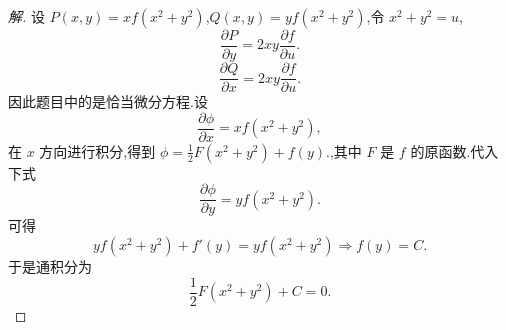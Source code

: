 \documentclass[twoside,11pt]{article}
\newcommand{\pa}{\partial} \newcommand{\Om}{\Omega}
\begin{document}
\begin{proof}[解]
  设 $P(x,y)=xf(x^2+y^2)$,$Q(x,y)=yf(x^2+y^2)$,令 $x^2+y^2=u$,
  \begin{equation}
    \label{eq:9.27pm}
    \frac{\pa P}{\pa y}=2xy\frac{\pa f}{\pa u}.
  \end{equation}
  \begin{equation}
    \label{eq:9.28}
    \frac{\pa Q}{\pa x}=2xy \frac{\pa f}{\pa u}.
  \end{equation}
因此题目中的是恰当微分方程.设
\begin{equation}
  \label{eq:9.39pm}
  \frac{\pa \phi}{\pa x}=xf(x^2+y^2),
\end{equation}
在 $x$ 方向进行积分,得到 $\phi=\frac{1}{2}F(x^2+y^2)+f(y).$,其中 $F$ 是
$f$ 的原函数.代入下式
\begin{equation}
  \label{eq:9.39}
  \frac{\pa \phi}{\pa y}=yf(x^2+y^2).
\end{equation}
可得
$$
yf(x^2+y^2)+f'(y)=yf(x^2+y^2)\Rightarrow f(y)=C.
$$
于是通积分为
$$
\frac{1}{2}F(x^2+y^2)+C=0.
$$
\end{proof}
\end{document}
